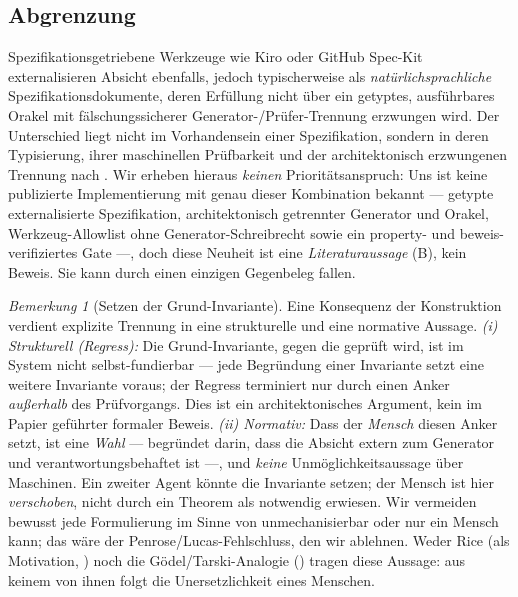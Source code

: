 \documentclass[11pt,a4paper]{article}
\theoremstyle{definition}
\theoremstyle{remark}
\newtheorem{bemerkung}{Bemerkung}[section]
\begin{document}
\subsection{Abgrenzung}
\label{sec:abgrenzung}

Spezifikationsgetriebene Werkzeuge wie Kiro oder GitHub Spec-Kit externalisieren Absicht
ebenfalls, jedoch typischerweise als \emph{natürlichsprachliche} Spezifikationsdokumente, deren
Erfüllung nicht über ein getyptes, ausführbares Orakel mit fälschungssicherer
Generator-/Prüfer-Trennung erzwungen wird. Der Unterschied liegt nicht im Vorhandensein einer
Spezifikation, sondern in deren Typisierung, ihrer maschinellen Prüfbarkeit und der
architektonisch erzwungenen Trennung nach . Wir erheben hieraus
\emph{keinen} Prioritätsanspruch: Uns ist keine publizierte Implementierung mit genau dieser
Kombination bekannt --- getypte externalisierte Spezifikation, architektonisch getrennter
Generator und Orakel, Werkzeug-Allowlist ohne Generator-Schreibrecht sowie ein
property- und beweis-verifiziertes Gate ---, doch diese Neuheit ist eine \emph{Literaturaussage}
(B), kein Beweis. Sie kann durch einen einzigen Gegenbeleg fallen.

\begin{bemerkung}[Setzen der Grund-Invariante]
\label{bem:grundinvariante}
Eine Konsequenz der Konstruktion verdient explizite Trennung in eine strukturelle und eine
normative Aussage. \emph{(i) Strukturell (Regress):} Die Grund-Invariante, gegen die geprüft
wird, ist im System nicht selbst-fundierbar --- jede Begründung einer Invariante setzt eine
weitere Invariante voraus; der Regress terminiert nur durch einen Anker \emph{außerhalb} des
Prüfvorgangs. Dies ist ein architektonisches Argument, kein im Papier geführter formaler
Beweis. \emph{(ii) Normativ:} Dass der \emph{Mensch} diesen Anker setzt, ist eine
\emph{Wahl} --- begründet darin, dass die Absicht extern zum Generator und
verantwortungsbehaftet ist ---, und \emph{keine} Unmöglichkeitsaussage über Maschinen. Ein
zweiter Agent könnte die Invariante setzen; der Mensch ist hier \emph{verschoben}, nicht durch
ein Theorem als notwendig erwiesen. Wir vermeiden bewusst jede Formulierung im Sinne von
\glqq unmechanisierbar\grqq{} oder \glqq nur ein Mensch kann\grqq{}; das wäre der Penrose/Lucas-Fehlschluss,
den wir ablehnen. Weder Rice (als Motivation, ) noch die Gödel/Tarski-Analogie
() tragen diese Aussage: aus
keinem von ihnen folgt die Unersetzlichkeit eines Menschen.
\end{bemerkung}
\end{document}
